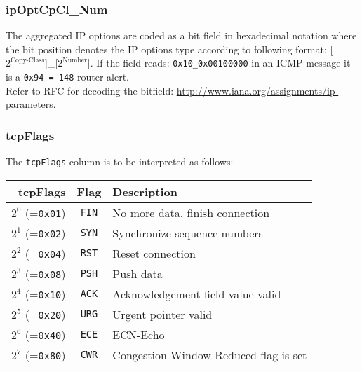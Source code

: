 \documentclass[documentation]{subfiles}
\begin{document}
\subsubsection{ipOptCpCl\_Num}\label{ipOptCpClNum}%
The aggregated IP options are coded as a bit field in hexadecimal notation where the bit position denotes the IP options type according to following format: [$2^{\text{Copy-Class}}$]\_[$2^{\text{Number}}$]. If the field reads: {\tt 0x10\_0x00100000} in an ICMP message it is a {\tt 0x94 = 148} router alert. \\
Refer to RFC for decoding the bitfield: \url{http://www.iana.org/assignments/ip-parameters}.

\subsubsection{tcpFlags}\label{tcpFlags}
The {\tt tcpFlags} column is to be interpreted as follows:
\begin{longtable}{rcl}
    \toprule
    {\bf tcpFlags} & {\bf Flag} & {\bf Description}\\
    \midrule\endhead%
    $2^0$ (={\tt 0x01}) & {\tt FIN} & No more data, finish connection\\
    $2^1$ (={\tt 0x02}) & {\tt SYN} & Synchronize sequence numbers\\
    $2^2$ (={\tt 0x04}) & {\tt RST} & Reset connection\\
    $2^3$ (={\tt 0x08}) & {\tt PSH} & Push data\\
    $2^4$ (={\tt 0x10}) & {\tt ACK} & Acknowledgement field value valid\\
    $2^5$ (={\tt 0x20}) & {\tt URG} & Urgent pointer valid\\
    $2^6$ (={\tt 0x40}) & {\tt ECE} & ECN-Echo\\
    $2^7$ (={\tt 0x80}) & {\tt CWR} & Congestion Window Reduced flag is set\\
    \bottomrule
\end{longtable}

\clearpage
\end{document}
